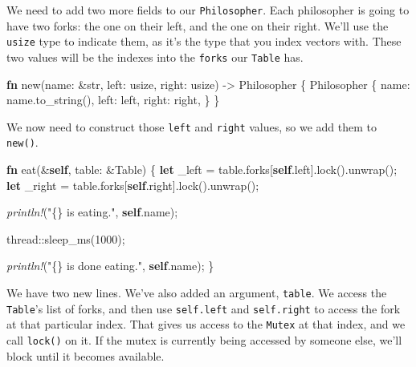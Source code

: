\documentclass[a4paper,]{book}
\newenvironment{Shaded}{\begin{snugshade}}{\end{snugshade}}
\newcommand{\KeywordTok}[1]{\textcolor[rgb]{0.13,0.29,0.53}{\textbf{{#1}}}}
\newcommand{\DataTypeTok}[1]{\textcolor[rgb]{0.13,0.29,0.53}{{#1}}}
\newcommand{\DecValTok}[1]{\textcolor[rgb]{0.00,0.00,0.81}{{#1}}}
\newcommand{\StringTok}[1]{\textcolor[rgb]{0.31,0.60,0.02}{{#1}}}
\newcommand{\PreprocessorTok}[1]{\textcolor[rgb]{0.56,0.35,0.01}{\textit{{#1}}}}
\newcommand{\NormalTok}[1]{{#1}}
\begin{document}
We need to add two more fields to our \texttt{Philosopher}. Each
philosopher is going to have two forks: the one on their left, and the
one on their right. We'll use the \texttt{usize} type to indicate them,
as it's the type that you index vectors with. These two values will be
the indexes into the \texttt{forks} our \texttt{Table} has.

\begin{Shaded}
\begin{Highlighting}[]
\KeywordTok{fn} \NormalTok{new(name: &}\DataTypeTok{str}\NormalTok{, left: }\DataTypeTok{usize}\NormalTok{, right: }\DataTypeTok{usize}\NormalTok{) -> Philosopher \{}
    \NormalTok{Philosopher \{}
        \NormalTok{name: name.to_string(),}
        \NormalTok{left: left,}
        \NormalTok{right: right,}
    \NormalTok{\}}
\NormalTok{\}}
\end{Highlighting}
\end{Shaded}

We now need to construct those \texttt{left} and \texttt{right} values,
so we add them to \texttt{new()}.

\begin{Shaded}
\begin{Highlighting}[]
\KeywordTok{fn} \NormalTok{eat(&}\KeywordTok{self}\NormalTok{, table: &Table) \{}
    \KeywordTok{let} \NormalTok{_left = table.forks[}\KeywordTok{self}\NormalTok{.left].lock().unwrap();}
    \KeywordTok{let} \NormalTok{_right = table.forks[}\KeywordTok{self}\NormalTok{.right].lock().unwrap();}

    \PreprocessorTok{println!}\NormalTok{(}\StringTok{"\{\} is eating."}\NormalTok{, }\KeywordTok{self}\NormalTok{.name);}

    \NormalTok{thread::sleep_ms(}\DecValTok{1000}\NormalTok{);}

    \PreprocessorTok{println!}\NormalTok{(}\StringTok{"\{\} is done eating."}\NormalTok{, }\KeywordTok{self}\NormalTok{.name);}
\NormalTok{\}}
\end{Highlighting}
\end{Shaded}

We have two new lines. We've also added an argument, \texttt{table}. We
access the \texttt{Table}'s list of forks, and then use
\texttt{self.left} and \texttt{self.right} to access the fork at that
particular index. That gives us access to the \texttt{Mutex} at that
index, and we call \texttt{lock()} on it. If the mutex is currently
being accessed by someone else, we'll block until it becomes available.
\end{document}
